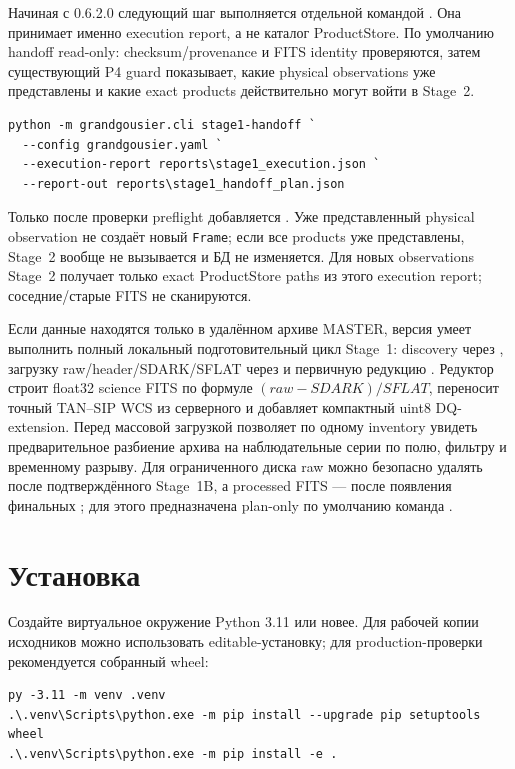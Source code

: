 Начиная с 0.6.2.0 следующий шаг выполняется отдельной командой . Она принимает именно execution report, а не каталог ProductStore. По умолчанию handoff read-only: checksum/provenance и FITS identity проверяются, затем существующий P4 guard показывает, какие physical observations уже представлены и какие exact products действительно могут войти в Stage~2.

\begin{lstlisting}
python -m grandgousier.cli stage1-handoff `
  --config grandgousier.yaml `
  --execution-report reports\stage1_execution.json `
  --report-out reports\stage1_handoff_plan.json
\end{lstlisting}

Только после проверки preflight добавляется . Уже представленный physical observation не создаёт новый \texttt{Frame}; если все products уже представлены, Stage~2 вообще не вызывается и БД не изменяется. Для новых observations Stage~2 получает только exact ProductStore paths из этого execution report; соседние/старые FITS не сканируются.

Если данные находятся только в удалённом архиве MASTER, версия \manualversion{} умеет выполнить полный локальный подготовительный цикл Stage~1: discovery через , загрузку raw/header/SDARK/SFLAT через  и первичную редукцию . Редуктор строит float32 science FITS по формуле $(raw-SDARK)/SFLAT$, переносит точный TAN--SIP WCS из серверного  и добавляет компактный uint8 DQ-extension. Перед массовой загрузкой  позволяет по одному inventory увидеть предварительное разбиение архива на наблюдательные серии по полю, фильтру и временному разрыву. Для ограниченного диска raw можно безопасно удалять после подтверждённого Stage~1B, а processed FITS --- после появления финальных ; для этого предназначена plan-only по умолчанию команда .

\section{Установка}

Создайте виртуальное окружение Python 3.11 или новее. Для рабочей копии исходников можно использовать editable-установку; для production-проверки рекомендуется собранный wheel:

\begin{lstlisting}
py -3.11 -m venv .venv
.\.venv\Scripts\python.exe -m pip install --upgrade pip setuptools wheel
.\.venv\Scripts\python.exe -m pip install -e .
\end{lstlisting}

